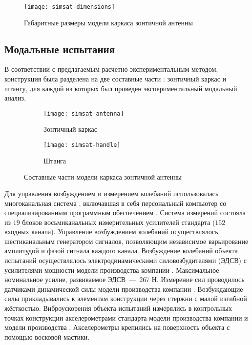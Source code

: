 \begin{figure}[!htb]
	\centerfloat
	\texttt{[image: simsat-dimensions]}
	\caption{Габаритные размеры модели каркаса зонтичной антенны} \label{fig:simsat-dimensions}
\end{figure}

\subsection{Модальные испытания}

В соответствии с предлагаемым расчетно-экспериментальным методом, конструкция была разделена на две составные части : зонтичный каркас и штангу, для каждой из которых был проведен экспериментальный модальный анализ.

\begin{figure}[!htb]
	\centering
	\begin{subfigure}[t]{0.48\textwidth}
		\centering
		\texttt{[image: simsat-antenna]}
		\caption{Зонтичный каркас}
	\end{subfigure}
	\hfill
	\begin{subfigure}[t]{0.48\textwidth}
		\centering
		\texttt{[image: simsat-handle]}
		\caption{Штанга}
	\end{subfigure}	
	\caption{Составные части модели каркаса зонтичной антенны} \label{fig:simsat-parts}
\end{figure}

Для управления возбуждением и измерением колебаний использовалась многоканальная система  , включавшая в себя персональный компьютер со специализированным программным обеспечением . Система измерений состояла из $ 19 $ блоков восьмиканальных измерительных усилителей стандарта  ($ 152 $ входных канала). Управление возбуждением колебаний осуществлялось шестиканальным генератором сигналов, позволяющим независимое варьирование амплитудой и фазой сигнала каждого канала. Возбуждение колебаний объекта испытаний осуществлялось электродинамическими силовозбудителями (ЭДСВ)  с усилителями мощности модели   производства компании  . Максимальное номинальное усилие, развиваемое ЭДСВ~---~$ 267 $ Н. Измерение сил проводилось датчиками динамической силы модели  производства компании . Возбуждающие силы прикладывались к элементам конструкции через стержни с малой изгибной жёсткостью. Виброускорения объекта испытаний измерялись в контрольных точках конструкции акселерометрами стандарта  модели  производства компании  и модели  производства  . Акселерометры крепились на поверхность объекта с помощью восковой мастики.

